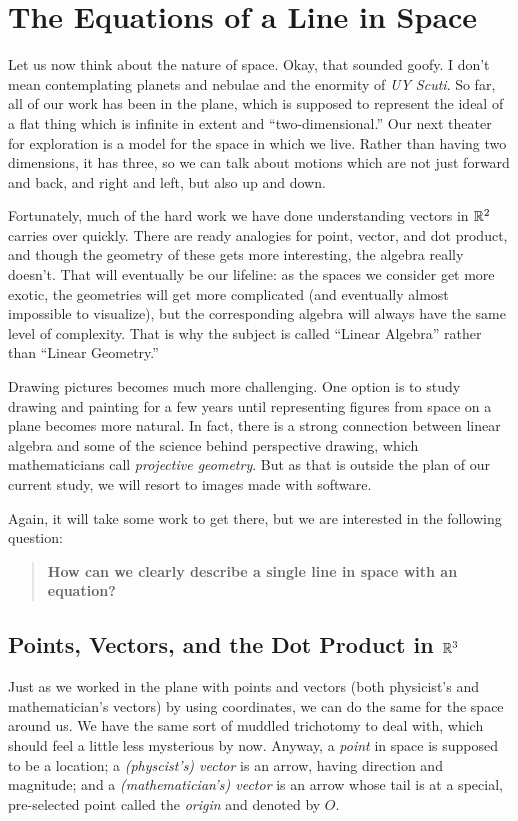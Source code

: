 \documentclass[00-livre-main.tex]{subfiles}
\begin{document}
\chapter{The Equations of a Line in Space}

Let us now think about the nature of space. Okay, that sounded goofy. I don't mean contemplating planets and nebulae and the enormity of \emph{UY Scuti}. 
So far, all of our work has been in the plane, which is supposed to represent the ideal of a flat thing which is infinite in extent and ``two-dimensional.'' Our next theater for exploration is a model for the space in which we live. Rather than having two dimensions, it has three, so we can talk about motions which are not just forward and back, and right and left, but also up and down.

Fortunately, much of the hard work we have done understanding vectors in $\mathbb{R}^2$ carries over quickly. There are ready analogies for point, vector, and dot product, and though the geometry of these gets more interesting, the algebra really doesn't. That will eventually be our lifeline: as the spaces we consider get more exotic, the geometries will get more complicated (and eventually almost impossible to visualize), but the corresponding algebra will always have the same level of complexity. That is why the subject is called ``Linear Algebra'' rather than ``Linear Geometry.''

Drawing pictures becomes much more challenging. One option is to study drawing and painting for a few years until representing figures from space on a plane becomes more natural. In fact, there is a strong connection between linear algebra and some of the science behind perspective drawing, which mathematicians call \emph{projective geometry}. But as that is outside the plan of our current study, we will resort to images made with software.

Again, it will take some work to get there, but we are interested in the following question:

\begin{quote}
\textbf{\large How can we clearly describe a single line in space with an equation?}
\end{quote}


\section*{Points, Vectors, and the Dot Product in $\mathbb{R}^3$}

Just as we worked in the plane with points and vectors (both physicist's and mathematician's vectors) by using coordinates, we can do the same for the space around us. We have the same sort of muddled trichotomy to deal with, which should feel a little less mysterious by now. Anyway, a \emph{point} in space is supposed to be a location; a \emph{(physcist's) vector} is an arrow, having direction and magnitude; and a \emph{(mathematician's) vector} is an arrow whose tail is at a special, pre-selected point called the \emph{origin} and denoted by $O$.
\end{document}
